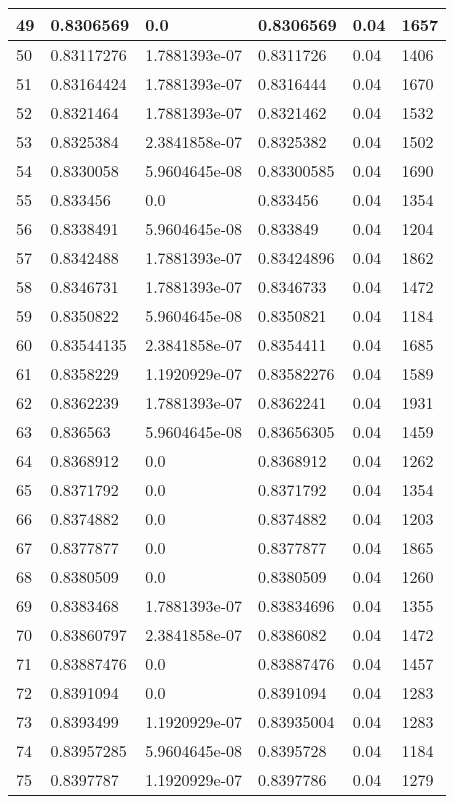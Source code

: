 \begin{longtable}{|l|l|l|l|l|l|}
49 & 0.8306569 & 0.0 & 0.8306569 & 0.04 & 1657 \\ \hline 
50 & 0.83117276 & 1.7881393e-07 & 0.8311726 & 0.04 & 1406 \\ \hline 
51 & 0.83164424 & 1.7881393e-07 & 0.8316444 & 0.04 & 1670 \\ \hline 
52 & 0.8321464 & 1.7881393e-07 & 0.8321462 & 0.04 & 1532 \\ \hline 
53 & 0.8325384 & 2.3841858e-07 & 0.8325382 & 0.04 & 1502 \\ \hline 
54 & 0.8330058 & 5.9604645e-08 & 0.83300585 & 0.04 & 1690 \\ \hline 
55 & 0.833456 & 0.0 & 0.833456 & 0.04 & 1354 \\ \hline 
56 & 0.8338491 & 5.9604645e-08 & 0.833849 & 0.04 & 1204 \\ \hline 
57 & 0.8342488 & 1.7881393e-07 & 0.83424896 & 0.04 & 1862 \\ \hline 
58 & 0.8346731 & 1.7881393e-07 & 0.8346733 & 0.04 & 1472 \\ \hline 
59 & 0.8350822 & 5.9604645e-08 & 0.8350821 & 0.04 & 1184 \\ \hline 
60 & 0.83544135 & 2.3841858e-07 & 0.8354411 & 0.04 & 1685 \\ \hline 
61 & 0.8358229 & 1.1920929e-07 & 0.83582276 & 0.04 & 1589 \\ \hline 
62 & 0.8362239 & 1.7881393e-07 & 0.8362241 & 0.04 & 1931 \\ \hline 
63 & 0.836563 & 5.9604645e-08 & 0.83656305 & 0.04 & 1459 \\ \hline 
64 & 0.8368912 & 0.0 & 0.8368912 & 0.04 & 1262 \\ \hline 
65 & 0.8371792 & 0.0 & 0.8371792 & 0.04 & 1354 \\ \hline 
66 & 0.8374882 & 0.0 & 0.8374882 & 0.04 & 1203 \\ \hline 
67 & 0.8377877 & 0.0 & 0.8377877 & 0.04 & 1865 \\ \hline 
68 & 0.8380509 & 0.0 & 0.8380509 & 0.04 & 1260 \\ \hline 
69 & 0.8383468 & 1.7881393e-07 & 0.83834696 & 0.04 & 1355 \\ \hline 
70 & 0.83860797 & 2.3841858e-07 & 0.8386082 & 0.04 & 1472 \\ \hline 
71 & 0.83887476 & 0.0 & 0.83887476 & 0.04 & 1457 \\ \hline 
72 & 0.8391094 & 0.0 & 0.8391094 & 0.04 & 1283 \\ \hline 
73 & 0.8393499 & 1.1920929e-07 & 0.83935004 & 0.04 & 1283 \\ \hline 
74 & 0.83957285 & 5.9604645e-08 & 0.8395728 & 0.04 & 1184 \\ \hline 
75 & 0.8397787 & 1.1920929e-07 & 0.8397786 & 0.04 & 1279 \\ \hline 
\end{longtable}